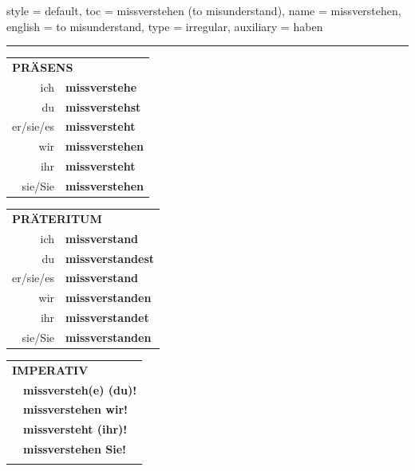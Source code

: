 \begin{verbentry}{
  style = {default},
  toc = {missverstehen (to misunderstand)},
  name = {missverstehen},
  english = {to misunderstand},
  type = {irregular},
  auxiliary = {haben}
}
 
    
     \vspace{5pt}

    \hrule
    
    \vspace{5pt}

  \begin{tabular}{rl}
     \multicolumn{2}{l}{\textbf{PRÄSENS} }\\
    ich & \textbf{missverstehe}\\
    du & \textbf{missverstehst}\\
    er/sie/es & \textbf{missversteht}\\
    wir & \textbf{missverstehen}\\
    ihr & \textbf{missversteht}\\
    sie/Sie & \textbf{missverstehen}\\
  \end{tabular}
  \hfill
     \begin{tabular}{rl}
    \multicolumn{2}{l}{\textbf{PRÄTERITUM} }\\
    ich & \textbf{missverstand}\\
    du & \textbf{missverstandest}\\
    er/sie/es & \textbf{missverstand}\\
    wir & \textbf{missverstanden}\\
    ihr & \textbf{missverstandet}\\
    sie/Sie & \textbf{missverstanden}\\
  \end{tabular}
  \hfill
  \begin{tabular}{rl}
     \multicolumn{2}{l}{\textbf{IMPERATIV} }\\
   & \textbf{missversteh(e) (du)!}\\
   & \textbf{missverstehen wir!}\\
   & \textbf{missversteht (ihr)!}\\
   & \textbf{missverstehen Sie!}\\
   & \vspace{10pt}
  \end{tabular}

    \vspace{10pt}


\end{verbentry}
